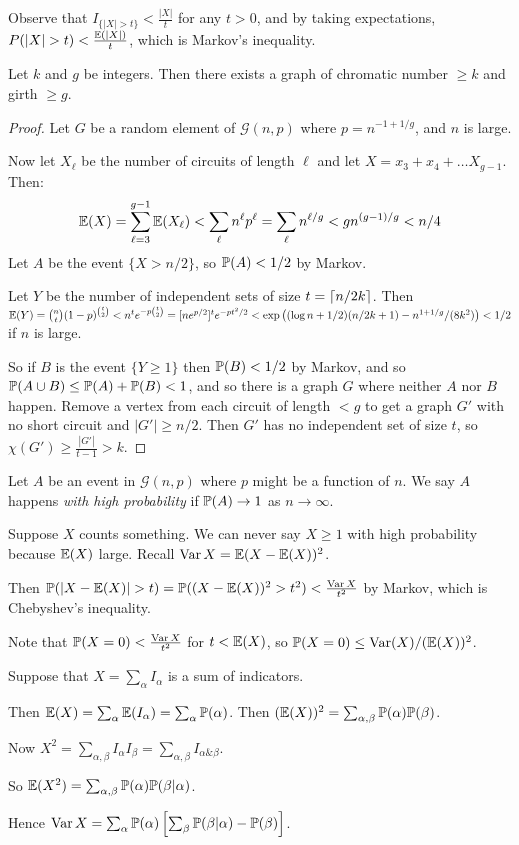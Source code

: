 \documentclass[10pt,a4paper]{article}
\begin{document}
Observe that $I_{\{|X|>t\}} < \frac{|X|}{t}$ for any $t > 0$, and by taking expectations, $P(|X|>t) < \frac{\E(|X|)}{t}$, which is Markov's inequality.

\begin{theorem}[Erdo\"os 1959]
Let $k$ and $g$ be integers. Then there exists a graph of chromatic number $\geq k$ and girth $\geq g$.
\end{theorem}
\begin{proof}
Let $G$ be a random element of $\mathcal{G}(n,p)$ where $p = n^{-1+1/g}$, and $n$ is large.

Now let $X_{\ell}$ be the number of circuits of length $\ell$ and let $X = x_3+x_4+\ldots X_{g-1}$. Then:
\begin{align*}
\E(X) = \sum_{\ell=3}^{g-1} \E(X_{\ell}) < \sum_{\ell} n^{\ell}p^{\ell} = \sum_{\ell}n^{\ell/g} < gn^{(g-1)/g} < n/4
\end{align*}
Let $A$ be the event $\{X>n/2\}$, so $\P(A) < 1/2$ by Markov.

Let $Y$ be the number of independent sets of size $t = \ceil{n/2k}$. Then $\E(Y) = \binom{n}{t}(1-p)^{\binom{t}{2}} < n^t e^{-p\binom{t}{2}} = [ne^{p/2}]^t e^{-pt^2/2} < \exp\left((\log n + 1/2)(n/2k + 1) - n^{1+1/g}/(8k^2)\right) < 1/2$ if $n$ is large.

So if $B$ is the event $\{Y \geq 1\}$ then $\P(B) < 1/2$ by Markov, and so $\P(A \cup B) \leq \P(A) + \P(B) < 1$, and so there is a graph $G$ where neither $A$ nor $B$ happen. Remove a vertex from each circuit of length $<g$ to get a graph $G'$ with no short circuit and $|G'|\geq n/2$. Then $G'$ has no independent set of size $t$, so $\chi(G') \geq \frac{|G'|}{t-1} > k$.
\end{proof}
Let $A$ be an event in $\mathcal{G}(n,p)$ where $p$ might be a function of $n$. We say $A$ happens \emph{with high probability} if $\P(A) \to 1$ as $n \to \infty$.

Suppose $X$ counts something. We can never say $X\geq 1$ with high probability because $\E(X)$ large. Recall $\Var X = \E(X-\E(X))^2$.

Then $\P(|X-\E(X)|>t) = \P((X-\E(X))^2 > t^2) < \frac{\Var X}{t^2}$ by Markov, which is Chebyshev's inequality.

Note that $\P(X=0) < \frac{\Var X}{t^2}$ for $t< \E(X)$, so $\P(X=0) \leq \Var(X)/(\E(X))^2$.

Suppose that $X = \sum_{\alpha}I_{\alpha}$ is a sum of indicators.

Then $\E(X) = \sum_{\alpha} \E(I_{\alpha}) = \sum_{\alpha}\P(\alpha)$. Then $(\E(X))^2 = \sum_{\alpha,\beta} \P(\alpha)\P(\beta)$.

Now $X^2 = \sum_{\alpha, \beta} I_{\alpha}I_{\beta} = \sum_{\alpha, \beta} I_{\alpha \& \beta}$.

So $\E(X^2) = \sum_{\alpha,\beta} \P(\alpha)\P(\beta|\alpha)$.

Hence $\Var X = \sum_{\alpha} \P(\alpha)\left[ \sum_{\beta} \P(\beta | \alpha) - \P(\beta)\right]$.
\end{document}
